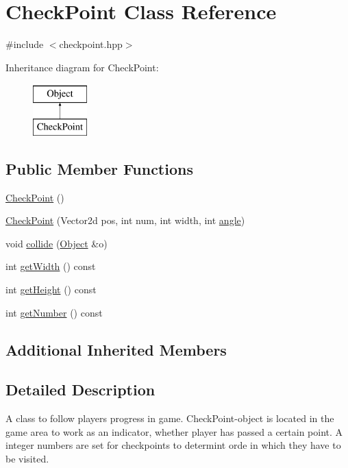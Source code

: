 \hypertarget{classCheckPoint}{}\section{Check\+Point Class Reference}
\label{classCheckPoint}


{\ttfamily \#include $<$checkpoint.\+hpp$>$}

Inheritance diagram for Check\+Point\+:\begin{figure}[H]
\begin{center}
\leavevmode
\includegraphics[height=2.000000cm]{classCheckPoint}
\end{center}
\end{figure}
\subsection*{Public Member Functions}
\begin{DoxyCompactItemize}
\item 
\hyperlink{classCheckPoint_a78e714da90f33a69c0413a2f51a988ad}{Check\+Point} ()
\item 
\hyperlink{classCheckPoint_a17653df57b3208932c20fceecf29e7a1}{Check\+Point} (Vector2d pos, int num, int width, int \hyperlink{classObject_aa08efab6c2c6898b1d0d7103076d8674}{angle})
\item 
void \hyperlink{classCheckPoint_abb225b6849ff500b0fe19cdeb927d1b6}{collide} (\hyperlink{classObject}{Object} \&o)
\item 
int \hyperlink{classCheckPoint_a6d0ba1960662239fe108211f3787ca12}{get\+Width} () const
\item 
int \hyperlink{classCheckPoint_a5356134c7455dac27e72dd144642e8ec}{get\+Height} () const
\item 
int \hyperlink{classCheckPoint_a22dca0111d35b2182b825ea6f03f94ed}{get\+Number} () const
\end{DoxyCompactItemize}
\subsection*{Additional Inherited Members}


\subsection{Detailed Description}
A class to follow player\textquotesingle{}s progress in game. Check\+Point-\/object is located in the game area to work as an indicator, whether player has passed a certain point. A integer numbers are set for checkpoints to determint orde in which they have to be visited. 

